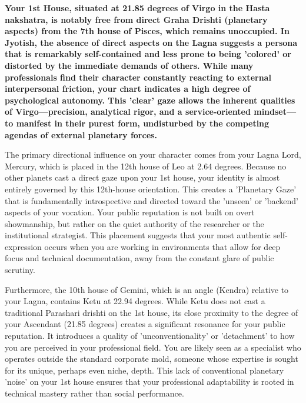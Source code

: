 
\label{topic10}

{\fontsize{9.5}{13.8}\selectfont\bfseries\color{DeepSlate} Your 1st House, situated at 21.85 degrees of Virgo in the Hasta nakshatra, is notably free from direct Graha Drishti (planetary aspects) from the 7th house of Pisces, which remains unoccupied. In Jyotish, the absence of direct aspects on the Lagna suggests a persona that is remarkably self-contained and less prone to being 'colored' or distorted by the immediate demands of others. While many professionals find their character constantly reacting to external interpersonal friction, your chart indicates a high degree of psychological autonomy. This 'clear' gaze allows the inherent qualities of Virgo---precision, analytical rigor, and a service-oriented mindset---to manifest in their purest form, undisturbed by the competing agendas of external planetary forces.}\par\vspace{2mm}

{\fontsize{9}{13}\selectfont The primary directional influence on your character comes from your Lagna Lord, Mercury, which is placed in the 12th house of Leo at 2.64 degrees. Because no other planets cast a direct gaze upon your 1st house, your identity is almost entirely governed by this 12th-house orientation. This creates a 'Planetary Gaze' that is fundamentally introspective and directed toward the 'unseen' or 'backend' aspects of your vocation. Your public reputation is not built on overt showmanship, but rather on the quiet authority of the researcher or the institutional strategist. This placement suggests that your most authentic self-expression occurs when you are working in environments that allow for deep focus and technical documentation, away from the constant glare of public scrutiny.}\par\vspace{1.8mm}

{\fontsize{9}{13}\selectfont Furthermore, the 10th house of Gemini, which is an angle (Kendra) relative to your Lagna, contains Ketu at 22.94 degrees. While Ketu does not cast a traditional Parashari drishti on the 1st house, its close proximity to the degree of your Ascendant (21.85 degrees) creates a significant resonance for your public reputation. It introduces a quality of 'unconventionality' or 'detachment' to how you are perceived in your professional field. You are likely seen as a specialist who operates outside the standard corporate mold, someone whose expertise is sought for its unique, perhaps even niche, depth. This lack of conventional planetary 'noise' on your 1st house ensures that your professional adaptability is rooted in technical mastery rather than social performance.}\par\vspace{1.8mm}

